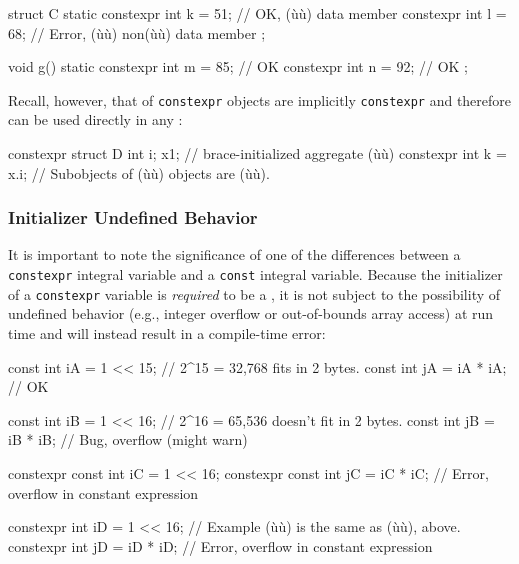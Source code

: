 \begin{enumerate}
{\begin{emcppslisting}
struct C
{
    static constexpr int k = 51;  // OK, (ù{}ù) data member
           constexpr int l = 68;  // Error, (ù{}ù) non(ù{}ù) data member
};

void g()
{
    static constexpr int m = 85;  // OK
           constexpr int n = 92;  // OK
};
\end{emcppslisting}

\noindent Recall, however, that  of
\lstinline!constexpr! objects are implicitly \lstinline!constexpr! and
therefore can be used directly in any :

\begin{emcppslisting}
constexpr struct D { int i; } x{1};  // brace-initialized aggregate (ù{}ù)
constexpr int k = x.i;  // Subobjects of (ù{}ù) objects are (ù{}ù).
\end{emcppslisting}
}
\end{enumerate}

\subsubsection[Initializer Undefined Behavior]{Initializer Undefined Behavior}

It is important to note the significance of one of the
differences between a \lstinline!constexpr! integral variable and a
\lstinline!const! integral variable. Because the initializer of a
\lstinline!constexpr! variable is \emph{required} to be a , it is not subject to the possibility of undefined behavior
(e.g., integer overflow or out-of-bounds array access) at run time and will
instead result in a compile-time error:

\begin{emcppslisting}
          const int iA = 1 << 15;  // 2^15 = 32,768 fits in 2 bytes.
          const int jA = iA * iA;  // OK

          const int iB = 1 << 16;  // 2^16 = 65,536 doesn't fit in 2 bytes.
          const int jB = iB * iB;  // Bug, overflow (might warn)

constexpr const int iC = 1 << 16;
constexpr const int jC = iC * iC;  // Error, overflow in constant expression

constexpr       int iD = 1 << 16;  // Example (ù{}ù) is the same as (ù{}ù), above.
constexpr       int jD = iD * iD;  // Error, overflow in constant expression
\end{emcppslisting}

